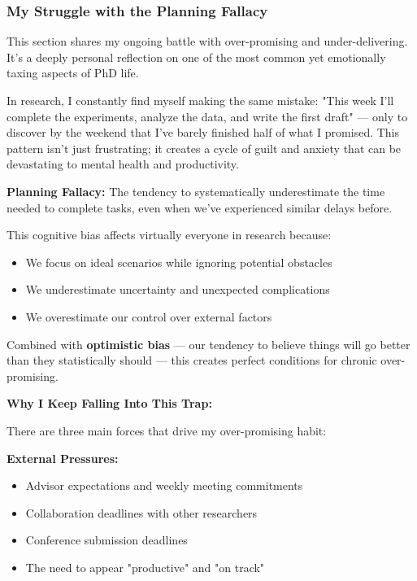 \documentclass[11pt,a4paper]{article}
\begin{document}
\subsubsection{My Struggle with the Planning Fallacy}

\begin{tcolorbox}[colback=blue!5,colframe=blue!40,title={Author's Note}]
This section shares my ongoing battle with over-promising and under-delivering. It's a deeply personal reflection on one of the most common yet emotionally taxing aspects of PhD life.
\end{tcolorbox}

In research, I constantly find myself making the same mistake: "This week I'll complete the experiments, analyze the data, and write the first draft" — only to discover by the weekend that I've barely finished half of what I promised. This pattern isn't just frustrating; it creates a cycle of guilt and anxiety that can be devastating to mental health and productivity.

\begin{tcolorbox}[colback=yellow!5,colframe=orange!60,title={Why This Happens: The Planning Fallacy}]
\textbf{Planning Fallacy:} The tendency to systematically underestimate the time needed to complete tasks, even when we've experienced similar delays before.

This cognitive bias affects virtually everyone in research because:
\begin{itemize}[leftmargin=1.5em]
    \item We focus on ideal scenarios while ignoring potential obstacles
    \item We underestimate uncertainty and unexpected complications
    \item We overestimate our control over external factors
\end{itemize}

Combined with \textbf{optimistic bias} — our tendency to believe things will go better than they statistically should — this creates perfect conditions for chronic over-promising.
\end{tcolorbox}

\textbf{Why I Keep Falling Into This Trap:}

There are three main forces that drive my over-promising habit:

\vspace{0.5em}
\textbf{External Pressures:} 
\begin{itemize}[leftmargin=1.5em]
    \item Advisor expectations and weekly meeting commitments
    \item Collaboration deadlines with other researchers
    \item Conference submission deadlines
    \item The need to appear "productive" and "on track"
\end{itemize}
\end{document}

